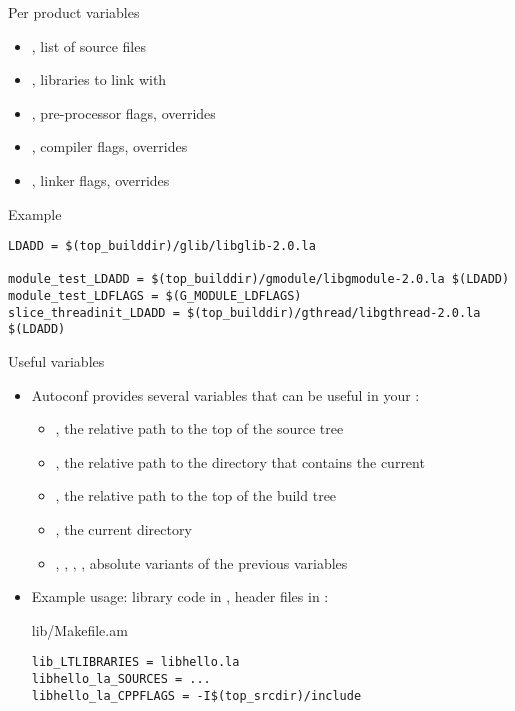 \begin{frame}[fragile]{Per product variables}
  \begin{itemize}
  \item {}, list of source files
  \item {}, libraries to link with
  \item {}, pre-processor flags, overrides 
  \item {}, compiler flags, overrides 
  \item {}, linker flags, overrides 
  \end{itemize}

  \begin{block}{Example}
\begin{verbatim}
LDADD = $(top_builddir)/glib/libglib-2.0.la

module_test_LDADD = $(top_builddir)/gmodule/libgmodule-2.0.la $(LDADD)
module_test_LDFLAGS = $(G_MODULE_LDFLAGS)
slice_threadinit_LDADD = $(top_builddir)/gthread/libgthread-2.0.la $(LDADD)
\end{verbatim}
  \end{block}
\end{frame}

\begin{frame}[fragile]{Useful variables}

  \begin{itemize}

  \item Autoconf provides several variables that can be useful in your
    :

    \begin{itemize}

    \item {}, the relative path to the top of the source tree
    \item {}, the relative path to the directory that contains the current 
    \item {}, the relative path to the top of the build tree
    \item {}, the current directory
    \item {}, ,
      , , absolute variants
      of the previous variables
    \end{itemize}

  \item Example usage: library code in , header files in
    :
    \begin{block}{lib/Makefile.am}
    \begin{verbatim}
lib_LTLIBRARIES = libhello.la
libhello_la_SOURCES = ...
libhello_la_CPPFLAGS = -I$(top_srcdir)/include
\end{verbatim}
\end{block}

  \end{itemize}

\end{frame}


